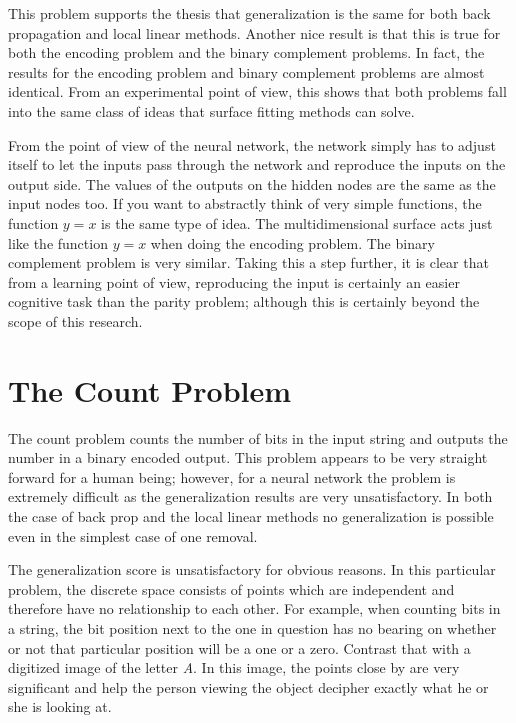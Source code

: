 	This problem supports the thesis that generalization is the
same for both back propagation and local linear methods.  Another nice
result is that this is true for both the encoding problem and the
binary complement problems.  In fact, the results for the encoding
problem and binary complement problems are almost identical.  From an
experimental point of view, this shows that both problems fall into
the same class of ideas that surface fitting methods can solve.

	From the point of view of the neural network, the network
simply has to adjust itself to let the inputs pass through the network
and reproduce the inputs on the output side.  The values of the
outputs on the hidden nodes are the same as the input nodes too.  If
you want to abstractly think of very simple functions, the function $y
= x$ is the same type of idea.  The multidimensional surface acts just
like the function $y = x$ when doing the encoding problem.  The binary
complement problem is very similar.  Taking this a step further, it is
clear that from a learning point of view, reproducing the input is
certainly an easier cognitive task than the parity problem; although
this is certainly beyond the scope of this research.

\section{The Count Problem}
	
	The count problem counts the number of bits in the input
string and outputs the number in a binary encoded output.  This
problem appears to be very straight forward for a human being;
however, for a neural network the problem is extremely difficult as
the generalization results are very unsatisfactory.  In both the case
of back prop and the local linear methods no generalization is
possible even in the simplest case of one removal.

	The generalization score is unsatisfactory for obvious
reasons.  In this particular problem, the discrete space consists of
points which are independent and therefore have no relationship to
each other.  For example, when counting bits in a string, the bit
position next to the one in question has no bearing on whether or not
that particular position will be a one or a zero.  Contrast that with
a digitized image of the letter {\it A}.  In this image, the points
close by are very significant and help the person viewing the object
decipher exactly what he or she is looking at.

